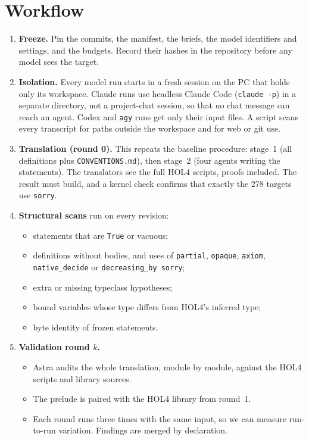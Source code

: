 \documentclass[11pt,a4paper]{article}
\newcommand{\code}[1]{\texttt{#1}}
\begin{document}
\section{Workflow}
\begin{enumerate}
\item \textbf{Freeze.} Pin the commits, the manifest, the briefs, the model identifiers and settings, and the budgets. Record their hashes in the repository before any model sees the target.

\item \textbf{Isolation.} Every model run starts in a fresh session on the PC that holds only its workspace. Claude runs use headless Claude Code (\code{claude -p}) in a separate directory, not a project-chat session, so that no chat message can reach an agent. Codex and \code{agy} runs get only their input files. A script scans every transcript for paths outside the workspace and for web or git use.

\item \textbf{Translation (round 0).} This repeats the baseline procedure: stage~1 (all definitions plus \code{CONVENTIONS.md}), then stage~2 (four agents writing the statements). The translators see the full HOL4 scripts, proofs included. The result must build, and a kernel check confirms that exactly the 278 targets use \code{sorry}.

\item \textbf{Structural scans} run on every revision:
\begin{itemize}
\item statements that are \code{True} or vacuous;
\item definitions without bodies, and uses of \code{partial}, \code{opaque}, \code{axiom}, \code{native\_decide} or \code{decreasing\_by sorry};
\item extra or missing typeclass hypotheses;
\item bound variables whose type differs from HOL4's inferred type;
\item byte identity of frozen statements.
\end{itemize}

\item \textbf{Validation round $k$.}
\begin{itemize}
\item Astra audits the whole translation, module by module, against the HOL4 scripts and library sources.
\item The prelude is paired with the HOL4 library from round~1.
\item Each round runs three times with the same input, so we can measure run-to-run variation. Findings are merged by declaration.
\end{itemize}


\end{enumerate}
\end{document}

